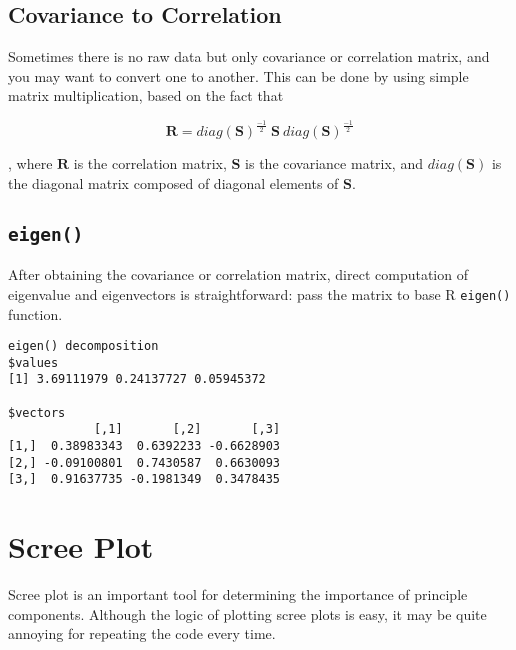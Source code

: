 \documentclass[]{book}
\newenvironment{Shaded}{\begin{snugshade}}{\end{snugshade}}
\newcommand{\KeywordTok}[1]{\textcolor[rgb]{0.13,0.29,0.53}{\textbf{#1}}}
\newcommand{\DecValTok}[1]{\textcolor[rgb]{0.00,0.00,0.81}{#1}}
\newcommand{\StringTok}[1]{\textcolor[rgb]{0.31,0.60,0.02}{#1}}
\newcommand{\OperatorTok}[1]{\textcolor[rgb]{0.81,0.36,0.00}{\textbf{#1}}}
\newcommand{\NormalTok}[1]{#1}
\theoremstyle{definition}
\theoremstyle{definition}
\theoremstyle{definition}
\theoremstyle{remark}
\begin{document}
\subsection{Covariance to Correlation}\label{covariance-to-correlation}

Sometimes there is no raw data but only covariance or correlation
matrix, and you may want to convert one to another. This can be done by
using simple matrix multiplication, based on the fact that

\[\mathbf{R} = diag(\mathbf{S})^{\frac{-1}{2}} ~ \mathbf{S} ~ diag(\mathbf{S})^{\frac{-1}{2}}
\label{eq:cov2cor}\]

, where \(\mathbf{R}\) is the correlation matrix, \(\mathbf{S}\) is the
covariance matrix, and \(diag(\mathbf{S})\) is the diagonal matrix
composed of diagonal elements of \(\mathbf{S}\).

\subsection{\texorpdfstring{\texttt{eigen()}}{eigen()}}\label{eigen}

After obtaining the covariance or correlation matrix, direct computation
of eigenvalue and eigenvectors is straightforward: pass the matrix to
base R \texttt{eigen()} function.

\begin{Shaded}
\end{Shaded}

\begin{verbatim}
eigen() decomposition
$values
[1] 3.69111979 0.24137727 0.05945372

$vectors
            [,1]       [,2]       [,3]
[1,]  0.38983343  0.6392233 -0.6628903
[2,] -0.09100801  0.7430587  0.6630093
[3,]  0.91637735 -0.1981349  0.3478435
\end{verbatim}

\section{Scree Plot}\label{scree-plot}

Scree plot is an important tool for determining the importance of
principle components. Although the logic of plotting scree plots is
easy, it may be quite annoying for repeating the code every time.
\end{document}
